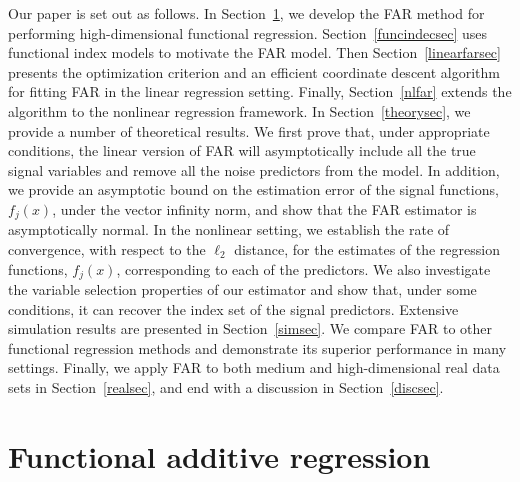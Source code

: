 \documentclass[aos,MSNbibl,dvips]{arximspdf}
\begin{document}
Our paper is set out as follows. In Section~\ref{linFARsec}, we
develop the FAR method for performing high-dimensional functional
regression. Section~\ref{funcindecsec} uses functional index models
to motivate the FAR model. Then Section~\ref{linearfarsec} presents
the optimization criterion and an efficient coordinate
descent algorithm for fitting FAR in the linear regression setting.
Finally, Section~\ref{nlfar} extends the algorithm to the nonlinear
regression framework.
In Section~\ref{theorysec}, we provide a number of theoretical
results. We first prove that, under appropriate conditions, the linear
version of FAR will asymptotically include all the true signal
variables and remove all the noise
predictors from the model. In addition, we provide an asymptotic bound
on the estimation error of the signal functions, $f_j(x)$, under the
vector infinity norm,\vadjust{\goodbreak} and show that the FAR estimator is asymptotically
normal. In the nonlinear setting, we establish the rate of
convergence, with respect to the $\ell_2$ distance, for the estimates
of the regression functions, $f_j(x)$, corresponding to each of the predictors.
We also investigate the variable selection properties of our estimator
and show that, under some conditions, it can recover the index set of
the signal predictors.
Extensive simulation results are presented in Section~\ref{simsec}. We
compare FAR to other functional regression methods and demonstrate its
superior performance in many settings. Finally, we apply FAR to both
medium and high-dimensional real data sets in Section~\ref{realsec},
and end with a discussion in
Section~\ref{discsec}.

\section{Functional additive regression}
\label{linFARsec}
\end{document}

